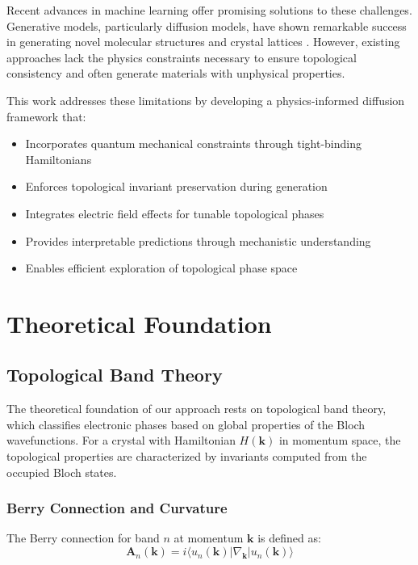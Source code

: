 \documentclass[12pt,a4paper]{article}
\begin{document}
Recent advances in machine learning offer promising solutions to these challenges. Generative models, particularly diffusion models, have shown remarkable success in generating novel molecular structures and crystal lattices \cite{hoogeboom2022equivariant, jiao2023crystal}. However, existing approaches lack the physics constraints necessary to ensure topological consistency and often generate materials with unphysical properties.

This work addresses these limitations by developing a physics-informed diffusion framework that:

\begin{itemize}
\item Incorporates quantum mechanical constraints through tight-binding Hamiltonians
\item Enforces topological invariant preservation during generation
\item Integrates electric field effects for tunable topological phases
\item Provides interpretable predictions through mechanistic understanding
\item Enables efficient exploration of topological phase space
\end{itemize}

\section{Theoretical Foundation}

\subsection{Topological Band Theory}

The theoretical foundation of our approach rests on topological band theory, which classifies electronic phases based on global properties of the Bloch wavefunctions. For a crystal with Hamiltonian $H(\mathbf{k})$ in momentum space, the topological properties are characterized by invariants computed from the occupied Bloch states.

\subsubsection{Berry Connection and Curvature}

The Berry connection for band $n$ at momentum $\mathbf{k}$ is defined as:
\begin{equation}
\mathbf{A}_n(\mathbf{k}) = i\langle u_n(\mathbf{k})|\nabla_{\mathbf{k}}|u_n(\mathbf{k})\rangle
\end{equation}
\end{document}
